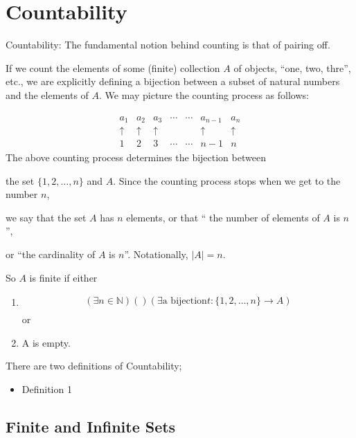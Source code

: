 \documentclass[12pt,a4paper,fleqn]{article}
\begin{document}
   \section{Countability} 

   Countability: The fundamental notion behind counting is that of pairing off.

   If we count the elements of some (finite) collection \(A\) of objects, ``one, two, thre'', etc., we are explicitly defining a bijection between a subset of natural numbers and the elements of \(A\). We may picture the counting process as follows:

\begin{align*}
\begin{array}{ccccccc}
a_1 & a_2 & a_3 & \cdots & \cdots & a_{n-1} & a_n \\
\uparrow & \uparrow & \uparrow & & & \uparrow & \uparrow \\
1 & 2 & 3 & \cdots & \cdots & n-1 & n
\end{array}
\end{align*}
The above counting process determines the bijection between 

the set \( \{ 1,2, \ldots, n\} \) and \(A\). Since the counting process stops when we get to the number \(n\), 

we say that the set \(A\) has \(n\) elements, or that `` the number of elements of \(A\) is \(n\)'', 

or ``the cardinality of \(A\) is \(n\)''. Notationally, \(|A|=n\).

So \(A\) is finite if either 
 \begin{enumerate}
  \item \begin{align*}
    \left( \exists n \in \mathbb{N} \right)\left(  \right) \left( \exists \text{a bijection} t: \{1,2,\ldots,n \} \to A \right)\\
  \end{align*}
  or
  
  \item A is empty.
 \end{enumerate}

There are two definitions of Countability;
\begin{itemize}
  \item Definition 1
\end{itemize}

 \subsection{Finite and Infinite Sets} 
\end{document}
